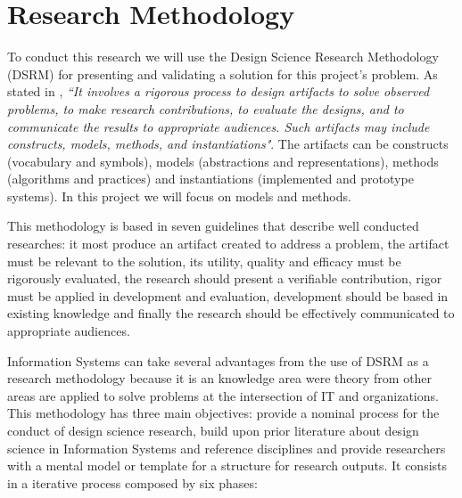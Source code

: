 
% 
% 

\section{Research Methodology}

To conduct this research we will use the Design Science Research Methodology (DSRM) \cite{DSRM} for presenting and validating a solution for this project's problem. As stated in \cite{DSRM}, \textit{``It involves a rigorous process to design artifacts to solve observed problems, to make research contributions, to evaluate the designs, and to communicate the results to appropriate audiences. Such artifacts may include constructs, models, methods, and instantiations"}. The artifacts can be constructs (vocabulary and symbols), models (abstractions and representations), methods (algorithms and practices) and instantiations (implemented and prototype systems). In this project we will focus on models and methods.\par
This methodology is based in seven guidelines that describe well conducted researches: it most produce an artifact created to address a problem, the artifact must be relevant to the solution, its utility, quality and efficacy must be rigorously evaluated, the research should present a verifiable contribution, rigor must be applied in development and evaluation, development should be based in existing knowledge and finally the research should be effectively communicated to appropriate audiences.\par
Information Systems can take several advantages from the use of DSRM as a research methodology because it is an knowledge area were theory from other areas are applied to solve problems at the intersection of IT and organizations.\cite{DSRM}
This methodology has three main objectives: provide a nominal process for the conduct of design science research, build upon prior literature about design science in Information Systems and reference disciplines and provide researchers with a mental model or template for a structure for research outputs. It consists in a iterative process composed by six phases:

